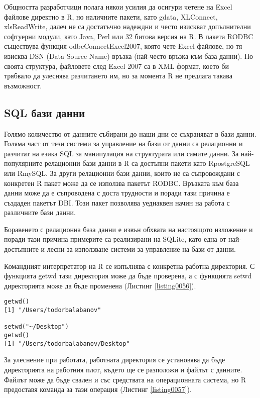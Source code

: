 Общността разработчици полага някои усилия да осигури четене на Excel файлове директно в R, но наличните пакети, като gdata, XLConnect, xlsReadWrite, далеч не са достатъчно надеждни и често изискват допълнителни софтуерни модули, като Java, Perl или 32 битова версия на R. В пакета RODBC съществува функция odbcConnectExcel2007, която чете Excel файлове, но тя изисква DSN (Data Source Name) връзка (най-често връзка към база данни). По своята структура, файловете след Excel 2007 са в XML формат, което би трябвало да улеснява разчитането им, но за момента R не предлага такава възможност. 

\subsection{SQL бази данни}

Голямо количество от данните събирани до наши дни се съхраняват в бази данни. Голяма част от тези системи за управление на бази от данни са релационни и разчитат на езика SQL за манипулация на структурата или самите данни. За най-популярните релационни бази данни в R са достъпни пакети като RpostgreSQL или RmySQL. За други релационни бази данни, които не са съпровождани с конкретен R пакет може да се използва пакетът RODBC. Връзката към база данни може да е съпроводена с доста трудности и поради тази причина е създаден пакетът DBI. Този пакет позволява уеднаквен начин на работа с различните бази данни. 

Боравенето с релационна база данни е извън обхвата на настоящото изложение и поради тази причина примерите са реализирани на SQLite, като една от най-достъпните и лесни за използване системи за управление на бази от данни. 

Командният интерпретатор на R се изпълнява с конкретна работна директория. С функцията getwd тази директория може да бъде проверена, а с функцията setwd директорията може да бъде променена (Листинг \ref{listing0056}). 

\begin{lstlisting}[caption=Работна директория, label=listing0056]
getwd()
[1] "/Users/todorbalabanov"

setwd("~/Desktop")
getwd()
[1] "/Users/todorbalabanov/Desktop"
\end{lstlisting}

За улеснение при работата, работната директория се установява да бъде директорията на работния плот, където ще се разположи и файлът с данните. Файлът може да бъде свален и със средствата на операционната система, но R предоставя команда за тази операция (Листинг \ref{listing0057}).

